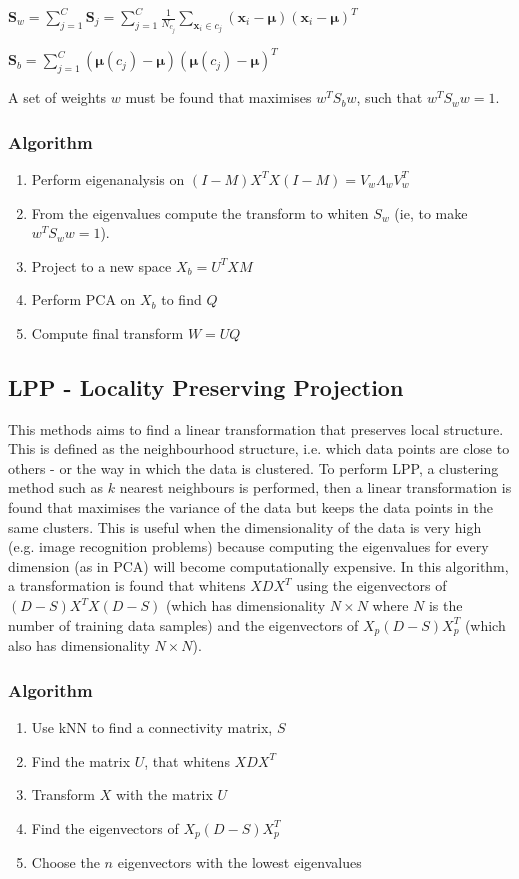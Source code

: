\documentclass[12pt]{article} %
\begin{document}
\(\pmb{S}_{w} = \sum\limits_{j=1}^C \pmb{S}_{j} = \sum\limits_{j=1}^C \frac{1}{N_{c_{j}}} \sum\limits_{\pmb{x}_{i} \in c_{j}} (\pmb{x}_{i} - \pmb{\mu})(\pmb{x}_{i} - \pmb{\mu})^T\) 

\( \pmb{S}_{b} = \sum\limits_{j=1}^C (\pmb{\mu}(c_{j}) - \pmb{\mu}) (\pmb{\mu}(c_{j}) - \pmb{\mu})^T \)

A set of weights \(w\) must be found that maximises \(w^{T}S_{b}w\), such that \(w^{T}S_{w}w = 1\).

\subsubsection{Algorithm}
\begin{enumerate}
\item Perform eigenanalysis on \((I-M)X^{T}X(I-M) = V_{w}\Lambda_{w}V_{w}^{T}\)
\item From the eigenvalues compute the transform to whiten \(S_{w}\) (ie, to make \(w^{T}S_{w}w = 1\)).
\item Project to a new space \(X_{b} = U^{T} X M\)
\item Perform PCA on \(X_{b}\) to find \(Q\)
\item Compute final transform \(W = U Q\)
\end{enumerate}


\subsection{LPP - Locality Preserving Projection}
This methods aims to find a linear transformation that preserves local structure. This is defined as the neighbourhood structure, i.e. which data points are close to others - or the way in which the data is clustered. To perform LPP, a clustering method such as \(k\) nearest neighbours is performed, then a linear transformation is found that maximises the variance of the data but keeps the data points in the same clusters. This is useful when the dimensionality of the data is very high (e.g. image recognition problems) because computing the eigenvalues for every dimension (as in PCA) will become computationally expensive. In this algorithm, a transformation is found that whitens \(XDX^{T}\) using the eigenvectors of \((D - S) X^{T} X (D - S)\) (which has dimensionality \(N \times N\) where \(N\) is the number of training data samples) and the eigenvectors of \(X_{p} (D - S) X_{p}^{T}\) (which also has dimensionality \(N \times N\)).

\subsubsection{Algorithm}
\begin{enumerate}
\item Use kNN to find a connectivity matrix, \(S\)
\item Find the matrix \(U\), that whitens \(XDX^{T}\)
\item Transform \(X\) with the matrix \(U\)
\item Find the eigenvectors of \(X_{p} (D - S) X_{p}^{T}\)
\item Choose the \(n\) eigenvectors with the lowest eigenvalues
\end{enumerate}
\end{document}
